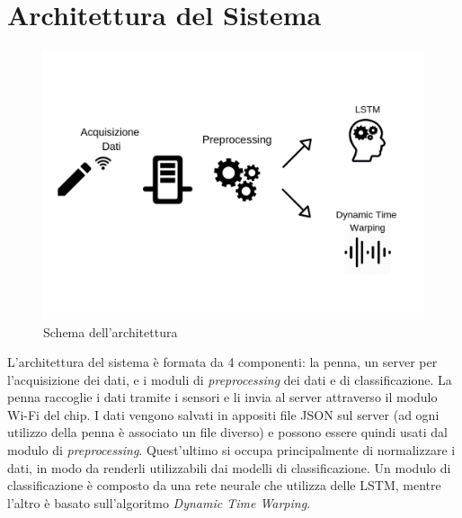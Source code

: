 \documentclass[8pt,notitlepage]{report}
\begin{document}
\chapter{Architettura del Sistema}
	\begin{figure}[H]
		\begin{center}
			\includegraphics[scale=.25]{architettura}
			\caption{Schema dell'architettura}
		\end{center}
	\end{figure}		
	L'architettura del sistema è formata da 4 componenti: la penna, un server per l'acquisizione dei dati, e i moduli di \textit{preprocessing} dei dati e di classificazione. La penna raccoglie i dati tramite i sensori e li invia al server attraverso il modulo Wi-Fi del chip. I dati vengono salvati in appositi file JSON sul server (ad ogni utilizzo della penna è associato un file diverso) e possono essere quindi usati dal modulo di \textit{preprocessing}. Quest'ultimo si occupa principalmente di normalizzare i dati, in modo da renderli utilizzabili dai modelli di classificazione. Un modulo di classificazione è composto da una rete neurale che utilizza delle LSTM, mentre l'altro è basato sull'algoritmo \textit{Dynamic Time Warping}.
\end{document}
